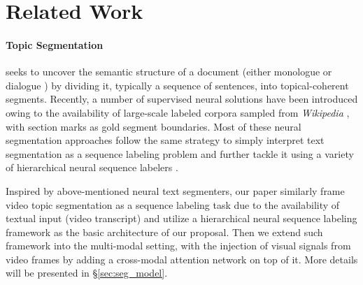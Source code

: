 \documentclass[runningheads]{llncs}
\begin{document}

\vspace{-1ex}
\section{Related Work} \label{sec:related_work}

\vspace{-1ex}
\paragraph{\textbf{Topic Segmentation}} seeks to uncover the semantic structure of a document (either monologue \cite{xing-etal-2020-improving} or dialogue \cite{xing-carenini-2021-improving}) by dividing it, typically a sequence of sentences, into topical-coherent segments. Recently, a number of supervised neural solutions have been introduced owing to the availability of large-scale labeled corpora sampled from \textit{Wikipedia} \cite{koshorek-etal-2018-text}, with section marks as gold segment boundaries.
Most of these neural segmentation approaches follow the same strategy to simply interpret text segmentation as a sequence labeling problem and further tackle it using a variety of hierarchical neural sequence labelers \cite{koshorek-etal-2018-text,li-etal-2018,xing-etal-2020-improving,xing-etal-2022-improving}.

Inspired by above-mentioned neural text segmenters, our paper similarly frame video topic segmentation as a sequence labeling task due to the availability of textual input (video transcript) and utilize a hierarchical neural sequence labeling framework as the basic architecture of our proposal. Then we extend such framework into the multi-modal setting, with the injection of visual signals from video frames by adding a cross-modal attention network on top of it. More details will be presented in \S\ref{sec:seg_model}.
\end{document}
